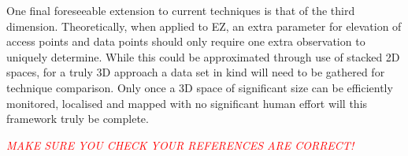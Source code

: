 \documentclass{UoYCSproject}
\begin{document}
        One final foreseeable extension to current techniques is that of the third dimension. Theoretically, when applied to EZ, an extra parameter for elevation of access points and data points should only require one extra observation to uniquely determine. While this could be approximated through use of stacked 2D spaces, for a truly 3D approach a data set in kind will need to be gathered for technique comparison. Only once a 3D space of significant size can be efficiently monitored, localised and mapped with no significant human effort will this framework truly be complete.
    
        \textcolor{red}{\emph{MAKE SURE YOU CHECK YOUR REFERENCES ARE CORRECT!}}
        
    
	
\end{document}
